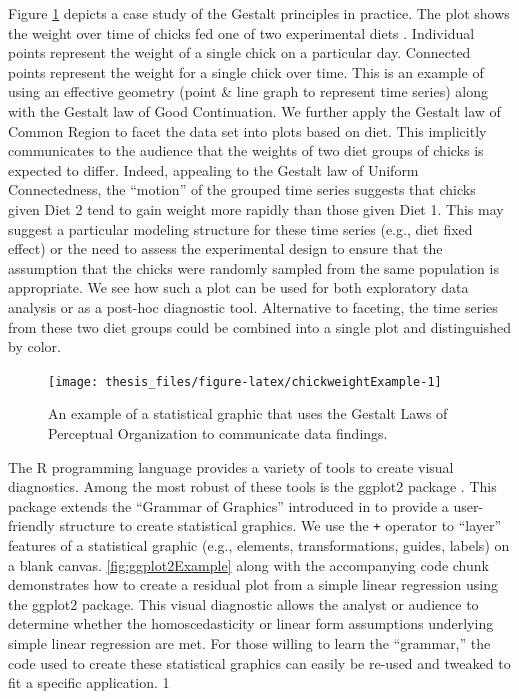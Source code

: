 \documentclass[11pt,]{isuthesis}
\begin{document}
Figure \ref{fig:chickweightExample} depicts a case study of the Gestalt principles in practice.
The plot shows the weight over time of chicks fed one of two experimental diets \citep{crowder1990analysis}.
Individual points represent the weight of a single chick on a particular day.
Connected points represent the weight for a single chick over time.
This is an example of using an effective geometry (point \& line graph to represent time series) along with the Gestalt law of Good Continuation.
We further apply the Gestalt law of Common Region to facet the data set into plots based on diet.
This implicitly communicates to the audience that the weights of two diet groups of chicks is expected to differ.
Indeed, appealing to the Gestalt law of Uniform Connectedness, the ``motion'' of the grouped time series suggests that chicks given Diet 2 tend to gain weight more rapidly than those given Diet 1.
This may suggest a particular modeling structure for these time series (e.g., diet fixed effect) or the need to assess the experimental design to ensure that the assumption that the chicks were randomly sampled from the same population is appropriate.
We see how such a plot can be used for both exploratory data analysis or as a post-hoc diagnostic tool.
Alternative to faceting, the time series from these two diet groups could be combined into a single plot and distinguished by color.

\begin{figure}[!htbp]

{\centering \texttt{[image: thesis\_files/figure-latex/chickweightExample-1]} 

}

\caption{An example of a statistical graphic that uses the Gestalt Laws of Perceptual Organization to communicate data findings.}\label{fig:chickweightExample}
\end{figure}

The R programming language \citep{Rlanguage} provides a variety of tools to create visual diagnostics.
Among the most robust of these tools is the ggplot2 package \citep{ggplot2}.
This package extends the ``Grammar of Graphics'' introduced in \citet{Wilkinson2005} to provide a user-friendly structure to create statistical graphics.
We use the \texttt{+} operator to ``layer'' features of a statistical graphic (e.g., elements, transformations, guides, labels) on a blank canvas.
\ref{fig:ggplot2Example} along with the accompanying code chunk demonstrates how to create a residual plot from a simple linear regression using the ggplot2 package.
This visual diagnostic allows the analyst or audience to determine whether the homoscedasticity or linear form assumptions underlying simple linear regression are met.
For those willing to learn the ``grammar,'' the code used to create these statistical graphics can easily be re-used and tweaked to fit a specific application.
1
\end{document}
